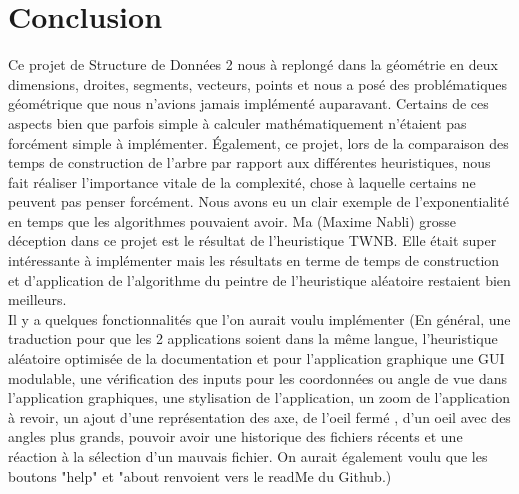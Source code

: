 \documentclass[a4paper,12pt]{report}	%
\renewcommand{\appendixpagename}{Annexes}	%
\begin{document}
	{\section*{Conclusion}}
	Ce projet de Structure de Données 2 nous à replongé dans la géométrie en deux dimensions, droites, segments, vecteurs, points et nous a posé des problématiques géométrique que nous n'avions jamais implémenté auparavant. Certains de ces aspects bien que parfois simple à calculer mathématiquement n'étaient pas forcément simple à implémenter. 
\indent Également, ce projet, lors de la comparaison des temps de construction de l'arbre par rapport aux différentes heuristiques, nous fait réaliser l'importance vitale de la complexité, chose à laquelle certains ne peuvent pas penser forcément. Nous avons eu un clair exemple de l'exponentialité en temps que les algorithmes pouvaient avoir. 
\indent Ma (Maxime Nabli) grosse déception dans ce projet est le résultat de l'heuristique TWNB. Elle était super intéressante à implémenter mais les résultats en terme de temps de construction et d'application de l'algorithme du peintre de l'heuristique aléatoire restaient bien meilleurs.
\\
Il y a quelques fonctionnalités que l'on aurait voulu implémenter (En général, une traduction pour que les 2 applications soient dans la même langue, l'heuristique aléatoire optimisée de la documentation et pour l'application graphique une GUI modulable, une vérification des inputs pour les coordonnées ou angle de vue dans l'application graphiques, une stylisation de l'application, un zoom de l'application à revoir, un ajout d'une représentation des axe, de l'oeil fermé , d'un oeil avec des angles plus grands, pouvoir avoir une historique des fichiers récents et une réaction à la sélection d'un mauvais fichier. On aurait également voulu que les boutons "help" et "about renvoient vers le readMe du Github.)\\


	
	

	
	
	
		


	
	\printbibliography
\end{document}
